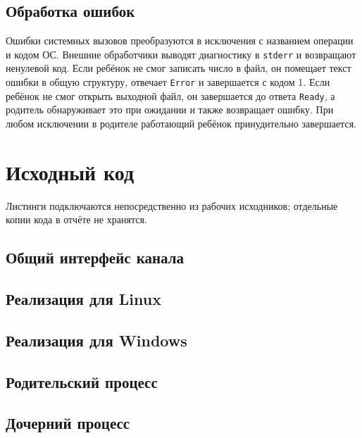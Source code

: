 \subsection{Обработка ошибок}
Ошибки системных вызовов преобразуются в исключения с названием операции и кодом ОС. Внешние обработчики выводят диагностику в \texttt{stderr} и возвращают ненулевой код. Если ребёнок не смог записать число в файл, он помещает текст ошибки в общую структуру, отвечает \texttt{Error} и завершается с кодом 1. Если ребёнок не смог открыть выходной файл, он завершается до ответа \texttt{Ready}, а родитель обнаруживает это при ожидании и также возвращает ошибку. При любом исключении в родителе работающий ребёнок принудительно завершается.

\section{Исходный код}
Листинги подключаются непосредственно из рабочих исходников; отдельные копии кода в отчёте не хранятся.

\subsection{Общий интерфейс канала}


\subsection{Реализация для Linux}


\subsection{Реализация для Windows}


\subsection{Родительский процесс}


\subsection{Дочерний процесс}

